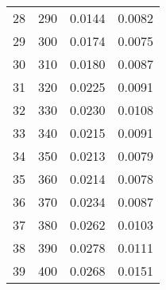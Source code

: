 \begin{table}
\begin{adjustbox}{width=1\textwidth/2}
\begin{tabular}{|c|c|c|c|}
\cline{1-4}
28 & 290 & 0.0144 & 0.0082 \\
\cline{1-4}
29 & 300 & 0.0174 & 0.0075 \\
\cline{1-4}
30 & 310 & 0.0180 & 0.0087 \\
\cline{1-4}
31 & 320 & 0.0225 & 0.0091 \\
\cline{1-4}
32 & 330 & 0.0230 & 0.0108 \\
\cline{1-4}
33 & 340 & 0.0215 & 0.0091 \\
\cline{1-4}
34 & 350 & 0.0213 & 0.0079 \\
\cline{1-4}
35 & 360 & 0.0214 & 0.0078 \\
\cline{1-4}
36 & 370 & 0.0234 & 0.0087 \\
\cline{1-4}
37 & 380 & 0.0262 & 0.0103 \\
\cline{1-4}
38 & 390 & 0.0278 & 0.0111 \\
\cline{1-4}
39 & 400 & 0.0268 & 0.0151 \\
\cline{1-4}
\end{tabular}
\end{adjustbox}
\end{table}

